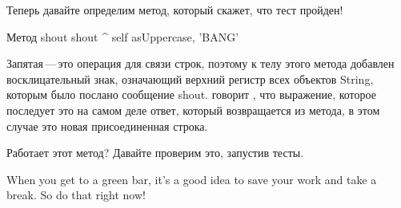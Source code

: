 \documentclass[a4paper,10pt,twoside]{book}
\begin{document}

Теперь давайте определим метод, который скажет, что тест пройден!



\begin{method}[shout]{Метод shout}
shout
	^ self asUppercase, 'BANG'
\end{method}


Запятая\,---\,это операция для связи строк, поэтому к телу этого метода
добавлен восклицательный знак, означающий верхний регистр всех
объектов String, которым было послано сообщение shout.  \ct{^} говорит
\pharo, что выражение, которое последует это на самом деле ответ,
который возвращается из метода, в этом случае это новая
присоединенная строка. 


Работает этот метод? Давайте проверим это, запустив тесты.

When you get to a green bar\footnotemark, it's a good idea to save your work and take a break.  
So do that right now!
\end{document}
